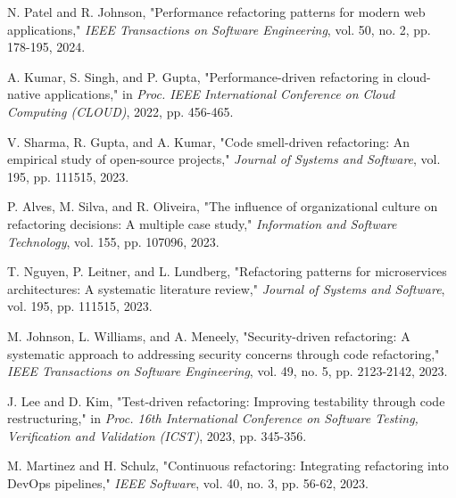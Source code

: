 \documentclass[journal,onecolumn]{IEEEtran}
\begin{document}
\begin{thebibliography}{00}
 N. Patel and R. Johnson, "Performance refactoring patterns for modern web applications," \textit{IEEE Transactions on Software Engineering}, vol. 50, no. 2, pp. 178-195, 2024.

 A. Kumar, S. Singh, and P. Gupta, "Performance-driven refactoring in cloud-native applications," in \textit{Proc. IEEE International Conference on Cloud Computing (CLOUD)}, 2022, pp. 456-465.

 V. Sharma, R. Gupta, and A. Kumar, "Code smell-driven refactoring: An empirical study of open-source projects," \textit{Journal of Systems and Software}, vol. 195, pp. 111515, 2023.

 P. Alves, M. Silva, and R. Oliveira, "The influence of organizational culture on refactoring decisions: A multiple case study," \textit{Information and Software Technology}, vol. 155, pp. 107096, 2023.

 T. Nguyen, P. Leitner, and L. Lundberg, "Refactoring patterns for microservices architectures: A systematic literature review," \textit{Journal of Systems and Software}, vol. 195, pp. 111515, 2023.

 M. Johnson, L. Williams, and A. Meneely, "Security-driven refactoring: A systematic approach to addressing security concerns through code refactoring," \textit{IEEE Transactions on Software Engineering}, vol. 49, no. 5, pp. 2123-2142, 2023.

 J. Lee and D. Kim, "Test-driven refactoring: Improving testability through code restructuring," in \textit{Proc. 16th International Conference on Software Testing, Verification and Validation (ICST)}, 2023, pp. 345-356.

 M. Martinez and H. Schulz, "Continuous refactoring: Integrating refactoring into DevOps pipelines," \textit{IEEE Software}, vol. 40, no. 3, pp. 56-62, 2023.
\end{thebibliography}
\end{document}
